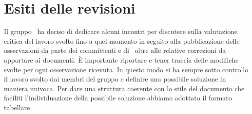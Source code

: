 \section{Esiti delle revisioni}
\label{esito}
Il gruppo \Gruppo\ ha deciso di dedicare alcuni incontri per discutere sulla valutazione critica del lavoro svolto fino a quel momento in seguito alla pubblicazione delle osservazioni da parte dei committenti e di \Proponente\, oltre alle relative correzioni da apportare ai documenti. È importante riportare e tener traccia delle modifiche svolte per ogni osservazione ricevuta. In questo modo si ha sempre sotto controllo il lavoro svolto dai membri del gruppo e definire una possibile soluzione in maniera univoca. Per dare una struttura coerente con lo stile del documento che faciliti l'individuazione della possibile soluzione abbiamo adottato il formato tabellare.
